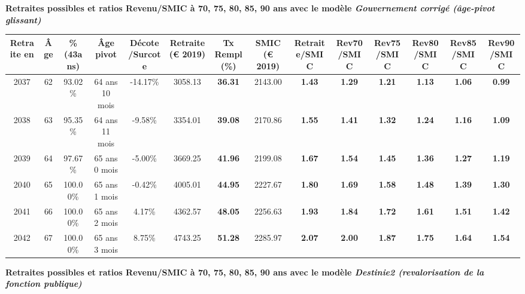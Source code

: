  \vspace{0.1cm} 
{\bf \noindent Retraites possibles et ratios Revenu/SMIC à 70, 75, 80, 85, 90 ans avec le modèle \emph{Gouvernement corrigé (âge-pivot glissant)}}  
 
\begin{adjustbox}{max width=\textwidth} 
\begin{tabular}[htb]{|c|c||c|c|c||c|c||c||c|c|c|c|c|c|} 
\hline 
 Retraite en &  Âge &  \%(43ans) &  Âge pivot &  Décote/Surcote &  Retraite (\euro{} 2019) &  Tx Rempl(\%) &  SMIC (\euro{} 2019) &  Retraite/SMIC &  Rev70/SMIC &  Rev75/SMIC &  Rev80/SMIC &  Rev85/SMIC &  Rev90/SMIC \\ 
\hline \hline 
 2037 &  62 &  93.02\% &  64 ans 10 mois &  -14.17\% &  3058.13 &  {\bf 36.31} &  2143.00 &  {\bf 1.43} &  {\bf 1.29} &  {\bf 1.21} &  {\bf 1.13} &  {\bf 1.06} &  {\bf {\color{red} 0.99}} \\ 
\hline 
 2038 &  63 &  95.35\% &  64 ans 11 mois &  -9.58\% &  3354.01 &  {\bf 39.08} &  2170.86 &  {\bf 1.55} &  {\bf 1.41} &  {\bf 1.32} &  {\bf 1.24} &  {\bf 1.16} &  {\bf 1.09} \\ 
\hline 
 2039 &  64 &  97.67\% &  65 ans 0 mois &  -5.00\% &  3669.25 &  {\bf 41.96} &  2199.08 &  {\bf 1.67} &  {\bf 1.54} &  {\bf 1.45} &  {\bf 1.36} &  {\bf 1.27} &  {\bf 1.19} \\ 
\hline 
 2040 &  65 &  100.00\% &  65 ans 1 mois &  -0.42\% &  4005.01 &  {\bf 44.95} &  2227.67 &  {\bf 1.80} &  {\bf 1.69} &  {\bf 1.58} &  {\bf 1.48} &  {\bf 1.39} &  {\bf 1.30} \\ 
\hline 
 2041 &  66 &  100.00\% &  65 ans 2 mois &  4.17\% &  4362.57 &  {\bf 48.05} &  2256.63 &  {\bf 1.93} &  {\bf 1.84} &  {\bf 1.72} &  {\bf 1.61} &  {\bf 1.51} &  {\bf 1.42} \\ 
\hline 
 2042 &  67 &  100.00\% &  65 ans 3 mois &  8.75\% &  4743.25 &  {\bf 51.28} &  2285.97 &  {\bf 2.07} &  {\bf 2.00} &  {\bf 1.87} &  {\bf 1.75} &  {\bf 1.64} &  {\bf 1.54} \\ 
\hline 
\hline 
\end{tabular} 
\end{adjustbox} 
 
 \vspace{0.1cm} 
{\bf \noindent Retraites possibles et ratios Revenu/SMIC à 70, 75, 80, 85, 90 ans avec le modèle \emph{Destinie2 (revalorisation de la fonction publique)}}  
 

